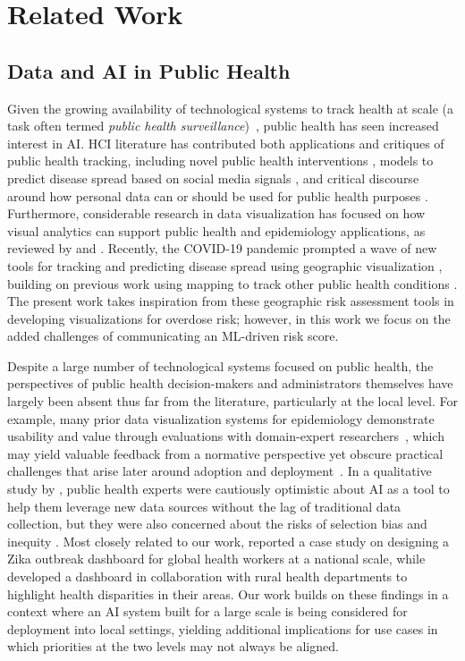 \section{Related Work}
\subsection{Data and AI in Public Health}

Given the growing availability of technological systems to track health at scale (a task often termed \textit{public health surveillance})~\cite{Fisher2022,Zeng2020}, public health has seen increased interest in AI. 
HCI literature has contributed both applications and critiques of public health tracking, including novel public health interventions \cite{Balaam2015}, models to predict disease spread based on social media signals \cite{Matero2023,Shahid2020}, and critical discourse around how personal data can or should be used for public health purposes \cite{Thakkar2022,Watson2021}. 
Furthermore, considerable research in data visualization has focused on how visual analytics can support public health and epidemiology applications, as reviewed by \citet{carroll_visualization_2014} and \citet{preim_survey_2020}.
Recently, the COVID-19 pandemic prompted a wave of new tools for tracking and predicting disease spread using geographic visualization \cite{Ghimire2021,Zhang2021,Chande2020}, building on previous work using mapping to track other public health conditions \cite{Maciejewski2011,Allen2016,Miranda2002}. The present work takes inspiration from these geographic risk assessment tools in developing visualizations for overdose risk; however, in this work we focus on the added challenges of communicating an ML-driven risk score.

Despite a large number of technological systems focused on public health, the perspectives of public health decision-makers and administrators themselves have largely been absent thus far from the literature, particularly at the local level. 
For example, many prior data visualization systems for epidemiology demonstrate usability and value through evaluations with domain-expert researchers~\cite{driedger_correction_2007,robinson_combining_2005}, which may yield valuable feedback from a normative perspective yet obscure practical challenges that arise later around adoption and deployment~\cite{carroll_visualization_2014,Fisher2022}.
In a qualitative study by \citeauthor{Morgenstern2021}, public health experts were cautiously optimistic about AI as a tool to help them leverage new data sources without the lag of traditional data collection, but they were also concerned about the risks of selection bias and inequity \cite{Morgenstern2021}. 
Most closely related to our work, \citet{mccurdy_framework_2019} reported a case study on designing a Zika outbreak dashboard for global health workers at a national scale, while \citet{backonja_supporting_2022} developed a dashboard in collaboration with rural health departments to highlight health disparities in their areas.
Our work builds on these findings in a context where an AI system built for a large scale is being considered for deployment into local settings, yielding additional implications for use cases in which priorities at the two levels may not always be aligned.

